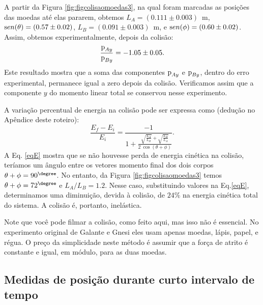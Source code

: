 A partir da Figura \ref{fig:figcolisaomoedas3}, na qual foram marcadas as posições das moedas até elas pararem, obtemos 
$L_A=(0.111 \pm 0.003)$~m, 
${\text sen}(\theta)=(0.57 \pm 0.02)$, 
$L_B=(0.091 \pm 0.003)$~m, 
e ${\text sen}(\phi)=(0.60 \pm 0.02)$. 
Assim, obtemos experimentalmente, depois da colisão:
\begin{equation}
\frac{{\text p}_{Ay}} {{\text p}_{By}} = - 1.05 \pm 0.05.
\end{equation}
Este resultado mostra que a soma das componentes ${\text p}_{Ay}$ e ${\text p}_{By}$, dentro do erro experimental, permanece igual a zero depois da colisão. Verificamos assim que a componente $y$ do momento linear total se conservou nesse experimento.

A variação percentual de energia na colisão pode ser expressa como (dedução no Apêndice deste roteiro):
\begin{equation}
\frac{E_f - E_i}{E_i} = \frac{-1}{1+ \displaystyle {\frac{\sqrt{\frac{L_A}{L_B}}+\sqrt{\frac{L_B}{L_A}}}{2~ \cos(\theta+\phi)}}}.
\label{eqE}
\end{equation}
A Eq. \ref{eqE} mostra que se não houvesse perda de energia cinética na colisão, teríamos um ângulo entre os vetores momento final dos dois corpos $\theta+\phi=90^{\degree}$. No entanto,
da Figura \ref{fig:figcolisaomoedas3} temos $\theta+\phi= 72^{\degree}$ e $L_A/L_B=1.2$. Nesse caso, substituindo valores na Eq.\ref{eqE}, determinamos uma diminuição, devida à colisão, de $24\%$ na energia cinética total do sistema. A colisão é, portanto, inelástica. 

Note que você pode filmar a colisão, como feito aqui, mas isso não é essencial. No experimento original de Galante e Gnesi eles usam apenas moedas, lápis, papel, e régua. O preço da simplicidade neste método é assumir que a força de atrito é constante e igual, em módulo, para as duas moedas. 


\subsection{ Medidas de posição durante curto intervalo de tempo}

